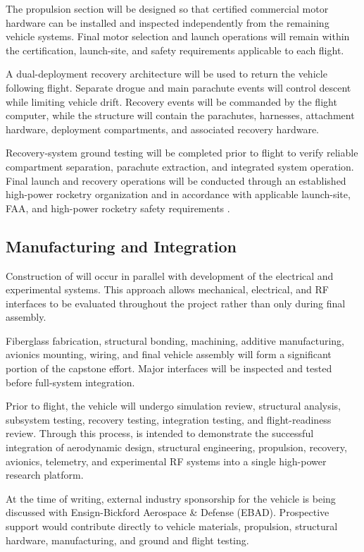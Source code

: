 The propulsion section will be designed so that certified commercial motor hardware can be installed and inspected independently from the remaining vehicle systems. Final motor selection and launch operations will remain within the certification, launch-site, and safety requirements applicable to each flight.

A dual-deployment recovery architecture will be used to return the vehicle following flight. Separate drogue and main parachute events will control descent while limiting vehicle drift. Recovery events will be commanded by the \comet{} flight computer, while the \ares{} structure will contain the parachutes, harnesses, attachment hardware, deployment compartments, and associated recovery hardware.

Recovery-system ground testing will be completed prior to flight to verify reliable compartment separation, parachute extraction, and integrated system operation. Final launch and recovery operations will be conducted through an established high-power rocketry organization and in accordance with applicable launch-site, FAA, and high-power rocketry safety requirements \cite{narsafety}.

\subsection{Manufacturing and Integration}

Construction of \ares{} will occur in parallel with development of the electrical and experimental systems. This approach allows mechanical, electrical, and RF interfaces to be evaluated throughout the project rather than only during final assembly.

Fiberglass fabrication, structural bonding, machining, additive manufacturing, avionics mounting, wiring, and final vehicle assembly will form a significant portion of the capstone effort. Major interfaces will be inspected and tested before full-system integration.

Prior to flight, the vehicle will undergo simulation review, structural analysis, subsystem testing, recovery testing, integration testing, and flight-readiness review. Through this process, \ares{} is intended to demonstrate the successful integration of aerodynamic design, structural engineering, propulsion, recovery, avionics, telemetry, and experimental RF systems into a single high-power research platform.

At the time of writing, external industry sponsorship for the \ares{} vehicle is being discussed with Ensign-Bickford Aerospace \& Defense (EBAD). Prospective support would contribute directly to vehicle materials, propulsion, structural hardware, manufacturing, and ground and flight testing.


